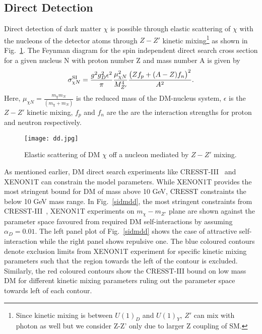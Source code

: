 \documentclass[prd,nofootinbib,preprint,superscriptaddress]{revtex4}
\begin{document}
\subsection{Direct Detection}
\label{dd}
Direct detection of dark matter $\chi$ is possible through elastic scattering of $\chi$ with the nucleons of the detector atoms through $Z-Z'$ kinetic mixing\footnote{Since kinetic mixing is between $U(1)_D$ and $U(1)_Y$, $Z'$ can mix with photon as well but we consider Z-Z' only due to larger Z coupling of SM.} as shown in Fig.~\ref{direct}. The Feynman diagram for the spin independent direct search cross section for a given nucleus N with proton number Z and mass number A is given by
\begin{equation}
\sigma^{\rm SI}_{\chi N}=\frac{g^2 g^2_D \epsilon^2}{\pi}\frac{ \mu^2_{\chi N}}{M^4_{Z'}} \frac{\big( Z f_p + (A-Z) f_n \big)^2}{A^2}.
\end{equation}
Here, $\mu_{\chi N} = \frac{m_\chi m_N}{(m_\chi+m_N)}$ is the reduced mass of the DM-nucleus system, $\epsilon$ is the $Z-Z'$ kinetic mixing, $f_p$ and $f_n$ are the are the interaction strengths for proton and neutron respectively.
\begin{figure}[h!]
\centering
\texttt{[image: dd.jpg]}
\caption{Elastic scattering of DM $\chi$ off a nucleon mediated by $Z-Z'$ mixing.}
\label{direct}
\end{figure}
As mentioned earlier, DM direct search experiments like CRESST-III~\cite{Abdelhameed:2019hmk} and XENON1T \cite{Aprile:2018dbl} can constrain the model parameters. While XENON1T provides the most stringent bound for DM of mass above 10 GeV, CRESST constraints the below 10 GeV mass range. In Fig.~\ref{sidmdd}, the most stringent constraints from CRESST-III~\cite{Abdelhameed:2019hmk}, XENON1T \cite{Aprile:2018dbl} experiments on $m_\chi-m_{Z'}$ plane are shown against the parameter space favoured from required DM self-interactions by assuming $\alpha_D=0.01$. The left panel plot of Fig.~\ref{sidmdd} shows the case of attractive self-interaction while the right panel shows repulsive one. The blue coloured contours denote exclusion limits from XENON1T experiment for specific kinetic mixing parameters such that the region towards the left of the contour is excluded. Similarly, the red coloured contours show the CRESST-III bound on low mass DM for different kinetic mixing parameters ruling out the parameter space towards left of each contour.
\end{document}
